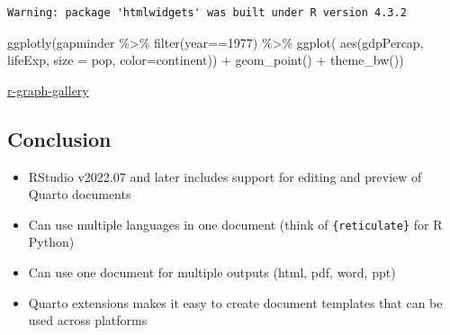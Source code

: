 \documentclass[
  letterpaper,
  DIV=11,
  numbers=noendperiod]{scrartcl}
\newenvironment{Shaded}{\begin{snugshade}}{\end{snugshade}}
\newcommand{\AttributeTok}[1]{\textcolor[rgb]{0.40,0.45,0.13}{#1}}
\newcommand{\DecValTok}[1]{\textcolor[rgb]{0.68,0.00,0.00}{#1}}
\newcommand{\FunctionTok}[1]{\textcolor[rgb]{0.28,0.35,0.67}{#1}}
\newcommand{\NormalTok}[1]{\textcolor[rgb]{0.00,0.23,0.31}{#1}}
\newcommand{\SpecialCharTok}[1]{\textcolor[rgb]{0.37,0.37,0.37}{#1}}
\providecommand{\tightlist}{%
  \setlength{\itemsep}{0pt}\setlength{\parskip}{0pt}}\usepackage{longtable,booktabs,array}
\begin{document}
\begin{verbatim}
Warning: package 'htmlwidgets' was built under R version 4.3.2
\end{verbatim}

\begin{Shaded}
\begin{Highlighting}[]
\FunctionTok{ggplotly}\NormalTok{(gapminder }\SpecialCharTok{\%\textgreater{}\%}
  \FunctionTok{filter}\NormalTok{(year}\SpecialCharTok{==}\DecValTok{1977}\NormalTok{) }\SpecialCharTok{\%\textgreater{}\%}
  \FunctionTok{ggplot}\NormalTok{( }\FunctionTok{aes}\NormalTok{(gdpPercap, lifeExp, }\AttributeTok{size =}\NormalTok{ pop, }\AttributeTok{color=}\NormalTok{continent)) }\SpecialCharTok{+}
  \FunctionTok{geom\_point}\NormalTok{() }\SpecialCharTok{+}
  \FunctionTok{theme\_bw}\NormalTok{())}
\end{Highlighting}
\end{Shaded}

\href{https://r-graph-gallery.com/interactive-charts.html}{r-graph-gallery}

\hypertarget{conclusion}{%
\subsection{Conclusion}\label{conclusion}}

\begin{itemize}
\tightlist
\item
  RStudio v2022.07 and later includes support for editing and preview of
  Quarto documents
\item
  Can use multiple languages in one document (think of
  \texttt{\{reticulate\}} for R  Python)
\item
  Can use one document for multiple outputs (html, pdf, word, ppt)
\item
  Quarto extensions makes it easy to create document templates that can
  be used across platforms
\end{itemize}

\hypertarget{section-1}{%
\subsection{}\label{section-1}}
\end{document}
